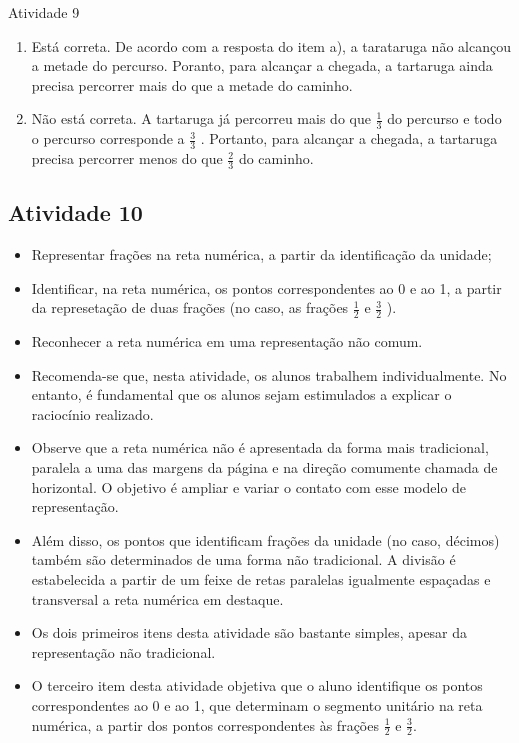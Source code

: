 \documentclass[oneside]{book}
\begin{document}
\begin{multicols}{2}
\begin{resposta*}{Atividade 9}
\begin{enumerate} [\quad a)]
  \item     Está correta. De acordo com a resposta do item a), a tarataruga não alcançou a metade do percurso. Poranto, para alcançar a chegada, a tartaruga ainda precisa percorrer mais do que a metade do caminho.
  \item     Não está correta. A tartaruga já percorreu mais do que      $\frac{1}{3}$     do percurso e todo o percurso corresponde a      $\frac{3}{3}$    . Portanto, para alcançar a chegada, a tartaruga precisa percorrer menos do que     $\frac{2}{3}$     do caminho.
\end{enumerate} %
\end{resposta*}

\subsection{Atividade 10}

\begin{itemize} %
    \item       Representar frações na reta numérica, a partir da identificação da unidade;
    \item       Identificar, na reta numérica, os pontos correspondentes ao 0 e ao 1, a partir da represetação de duas frações (no caso, as frações       $\frac{1}{2}$       e       $\frac{3}{2}$      ).
    \item       Reconhecer a reta numérica em uma representação não comum.
\end{itemize} %
      

\begin{itemize} %
    \item       Recomenda-se que, nesta atividade, os alunos trabalhem individualmente. No entanto, é fundamental que os alunos sejam estimulados a explicar o raciocínio realizado.
    \item       Observe que a reta numérica não é apresentada da forma mais tradicional, paralela a uma das margens da página e na direção comumente chamada de horizontal. O objetivo é ampliar e variar o contato com esse modelo de representação. 
    \item       Além disso, os pontos que identificam frações da unidade (no caso, décimos) também são determinados de uma forma não tradicional. A divisão é estabelecida a partir de um feixe de retas paralelas igualmente espaçadas  e transversal a reta numérica em destaque. 
    \item       Os dois primeiros itens desta atividade são bastante simples, apesar da representação não tradicional. 
    \item       O terceiro item desta atividade objetiva que o aluno identifique os pontos correspondentes ao 0 e ao 1, que determinam o segmento unitário na reta numérica, a partir dos pontos correspondentes às frações       $\frac{1}{2}$       e       $\frac{3}{2}$.  
\end{itemize} %


\end{multicols}
\end{document}

